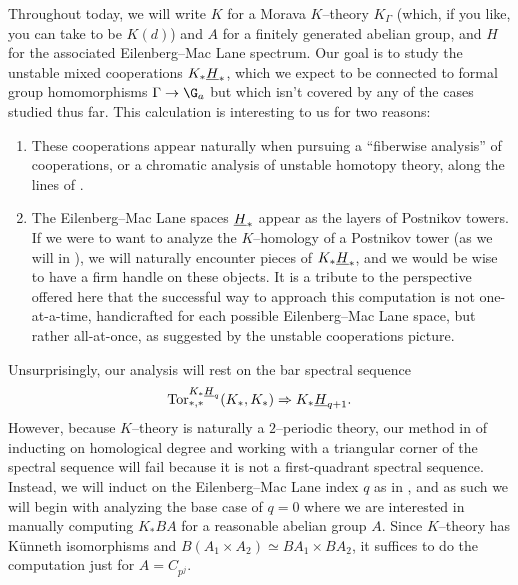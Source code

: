 
Throughout today, we will write $K$ for a Morava $K$--theory $K_\Gamma$ (which, if you like, you can take to be $K(d)$) and $A$ for a finitely generated abelian group, and $H$ for the associated Eilenberg--Mac Lane spectrum.  Our goal is to study the unstable mixed cooperations $K_* \underline{\smash{H}}_{*}$, which we expect to be connected to formal group homomorphisms $\Gamma \to \G_a$ but which isn't covered by any of the cases studied thus far.  This calculation is interesting to us for two reasons:
\begin{enumerate}
\item These cooperations appear naturally when pursuing a ``fiberwise analysis'' of cooperations, or a chromatic analysis of unstable homotopy theory, along the lines of .
\item The Eilenberg--Mac Lane spaces $\underline{\smash{H}}_{*}$ appear as the layers of Postnikov towers.  If we were to want to analyze the $K$--homology of a Postnikov tower (as we will in ), we will naturally encounter pieces of $K_* \underline{\smash{H}}_{*}$, and we would be wise to have a firm handle on these objects.  It is a tribute to the perspective offered here that the successful way to approach this computation is not one-at-a-time, handicrafted for each possible Eilenberg--Mac Lane space, but rather all-at-once, as suggested by the unstable cooperations picture.
\end{enumerate}

Unsurprisingly, our analysis will rest on the bar spectral sequence \[\operatorname{Tor}^{K_* \underline{\smash{H}}_{q}}_{*, *}(K_*, K_*) \Rightarrow K_* \underline{\smash{H}}_{q+1}.\]  However, because $K$--theory is naturally a $2$--periodic theory, our method in  of inducting on homological degree and working with a triangular corner of the spectral sequence will fail because it is not a first-quadrant spectral sequence.  Instead, we will induct on the Eilenberg--Mac Lane index $q$ as in , and as such we will begin with analyzing the base case of $q = 0$ where we are interested in manually computing $K_* BA$ for a reasonable abelian group $A$.  Since $K$--theory has K\"unneth isomorphisms and $B(A_1 \times A_2) \simeq BA_1 \times BA_2$, it suffices to do the computation just for $A = C_{p^j}$. 

